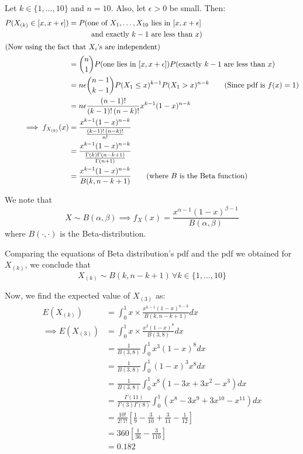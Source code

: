 \documentclass[12pt, oneside]{article}
\begin{document}
\begin{enumerate}
{  Let \(k \in \{1, \ldots, 10\}\) and \(n = 10\). Also, let \(\epsilon > 0\) be small. Then:
  \begin{align*}
    P(X_{(k)} \in [x, x + \epsilon]) &= P(\text{one of \({X_1, \ldots, X_{10}}\) lies in \([x, x + \epsilon]\)} \\
                                     &  \text{~~~~~~~~~and exactly \(k-1\) are less than \(x\)}) \\
      \intertext{(Now using the fact that \(X_i\)'s are independent)}
      &= {n \choose 1} P(\text{one lies in \([x, x + \epsilon]\)}) P(\text{exactly \(k-1\) are less than \(x\)}) \\
      &= n \epsilon {{n - 1} \choose {k - 1}} P(X_1 \leq x)^{k-1} P(X_1 > x)^{n-k} \tag*{(Since pdf is \(f(x) = 1\))} \\
      &= n \epsilon \frac{(n - 1)!}{(k - 1)!\,(n-k)!} x^{k-1} (1-x)^{n-k} \\
    \implies f_{X_{(k)}}(x) &= \frac{ x^{k-1} (1-x)^{n-k}}{\frac{{(k - 1)!\,(n-k)!}}{n!}} \\
      &= \frac{x^{k-1} (1-x)^{n-k}}{\frac{\Gamma(k) \Gamma(n-k+1)}{\Gamma(n+1)}} \\
      &= \frac{x^{k-1} (1-x)^{n-k}}{B(k, n - k + 1)} \tag*{(where \(B\) is the Beta function)}
  \end{align*}

  We note that
  \[X \sim B(\alpha, \beta) \implies f_X(x) = \frac{x^{\alpha - 1}(1-x)^{\beta - 1}}{B(\alpha, \beta)}\]
  where \(B(\cdot, \cdot)\) is the Beta-distribution.

  Comparing the equations of Beta distribution's pdf and the pdf we obtained for \(X_{(k)}\), we
  conclude that \[X_{(k)} \sim B(k, n - k + 1) \,\forall k \in \{1, \ldots, 10\}\]

  Now, we find the expected value of \(X_{(3)}\) as:
  \begin{align*}
    E(X_{(k)}) &= \int_{0}^{1} x \times \frac{x^{k-1} (1-x)^{n-k}}{B(k, n - k + 1)} dx \\
    \implies E(X_{(3)}) &= \int_{0}^{1} x \times \frac{x^{2} (1-x)^{8}}{B(3, 8)} dx \tag*{(\(\because n = 10\))} \\
      &= \frac{1}{B(3, 8)} \int_{0}^{1} x^3 (1 - x)^8 dx \\
      &= \frac{1}{B(3, 8)} \int_{0}^{1} (1 - x)^3 x^8 dx \\
      &= \frac{1}{B(3, 8)} \int_{0}^{1} x^8 (1 - 3x + 3x^2 - x^3) dx \\
      &= \frac{\Gamma(11)}{\Gamma(3)\Gamma(8)} \int_{0}^{1} (x^8 - 3x^9 + 3x^{10} - x^{11}) dx \\
      &= \frac{10!}{2!\,7!} \left[\frac{1}{9} - \frac{3}{10} + \frac{3}{11} - \frac{1}{12}\right] \\
      &= 360 \left[ \frac{1}{36} - \frac{3}{110} \right] \\
      &= 0.182
  \end{align*}

}
\end{enumerate}
\end{document}
